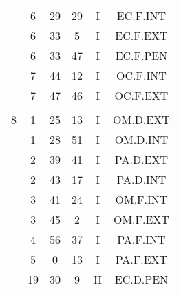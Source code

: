 \documentclass[12pt, a4paper]{article}
\begin{document}
\begin{multicols}{3}
{\begin{tabular}{c c c c c c}
	 	 	 	 & 6 & 29 & 29 & I & EC.F.INT\\%
	 	 	 	 & 6 & 33 & 5 & I & EC.F.EXT\\%
	 	 	 	 & 6 & 33 & 47 & I & EC.F.PEN\\%
	 	 	 	 & 7 & 44 & 12 & I & OC.F.INT\\%
	 	 	 	 & 7 & 47 & 46 & I & OC.F.EXT\\%
	 	 	 	 & & & & & \\%
	 	 	 	8 & 1 & 25 & 13 & I & OM.D.EXT\\%
	 	 	 	 & 1 & 28 & 51 & I & OM.D.INT\\%
	 	 	 	 & 2 & 39 & 41 & I & PA.D.EXT\\%
	 	 	 	 & 2 & 43 & 17 & I & PA.D.INT\\%
	 	 	 	 & 3 & 41 & 24 & I & OM.F.INT\\%
	 	 	 	 & 3 & 45 & 2 & I & OM.F.EXT\\%
	 	 	 	 & 4 & 56 & 37 & I & PA.F.INT\\%
	 	 	 	 & 5 & 0 & 13 & I & PA.F.EXT\\%
	 	 	 	 & 19 & 30 & 9 & II & EC.D.PEN\\%
	 	 \end{tabular}
 	}
\end{multicols}
\end{document}
